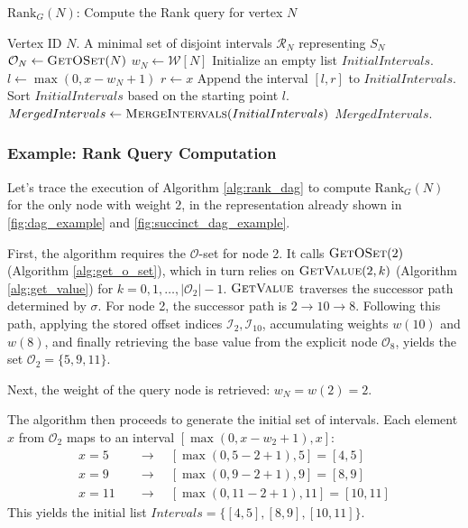 \begin{algorithm}
    \caption{$\mathrm{Rank}_G(N)$: Compute the Rank query for vertex $N$}
    \label{alg:rank_dag}
    \small
    \begin{algorithmic}[1]
        \Require Vertex ID $N$.
        \Ensure A minimal set of disjoint intervals $\mathcal{R}_N$ representing $S_N$
        \State $\mathcal{O}_N \gets \textsc{GetOSet}(N)$
        \State $w_N \gets \mathcal{W}[N]$
        \State Initialize an empty list $InitialIntervals$.
        \State $l \gets \max(0, x - w_N + 1)$
        \State $r \gets x$
        \State Append the interval $[l, r]$ to $InitialIntervals$.
        \EndFor
        \State Sort $InitialIntervals$ based on the starting point $l$.
        \State $MergedIntervals \gets \textsc{MergeIntervals}(InitialIntervals)$
        \State \Return $MergedIntervals$.
    \end{algorithmic}
\end{algorithm}



\subsubsection*{Example: Rank Query Computation \label{subsubsec:rank_query_example_node2}}

Let's trace the execution of Algorithm \ref{alg:rank_dag} to compute $\mathrm{Rank}_G(N)$ for the only node with weight $2$, in the representation already shown in \autoref{fig:dag_example} and \autoref{fig:succinct_dag_example}.

First, the algorithm requires the $\mathcal{O}$-set for node 2. It calls $\textsc{GetOSet}(2)$ (Algorithm \ref{alg:get_o_set}), which in turn relies on $\textsc{GetValue}(2, k)$ (Algorithm \ref{alg:get_value}) for $k=0, 1, \dots, |\mathcal{O}_2|-1$. $\textsc{GetValue}$ traverses the successor path determined by $\sigma$. For node 2, the successor path is $2 \to 10 \to 8$. Following this path, applying the stored offset indices $\mathcal{I}_2, \mathcal{I}_{10}$, accumulating weights $w(10)$ and $w(8)$, and finally retrieving the base value from the explicit node $\mathcal{O}_8$, yields the set $\mathcal{O}_2 = \{5, 9, 11\}$.

Next, the weight of the query node is retrieved: $w_N = w(2) = 2$.

The algorithm then proceeds to generate the initial set of intervals. Each element $x$ from $\mathcal{O}_2$ maps to an interval $[\max(0, x - w_2 + 1), x]$:
\begin{align*}
    x=5 \quad  & \longrightarrow \quad [\max(0, 5 - 2 + 1), 5] = [4, 5]     \\
    x=9 \quad  & \longrightarrow \quad [\max(0, 9 - 2 + 1), 9] = [8, 9]     \\
    x=11 \quad & \longrightarrow \quad [\max(0, 11 - 2 + 1), 11] = [10, 11]
\end{align*}
This yields the initial list $Intervals = \{ [4, 5], [8, 9], [10, 11] \}$.

